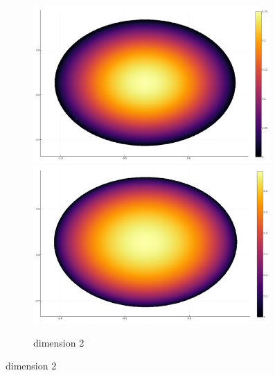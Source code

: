\documentclass[10pt,a4paper]{report}
\theoremstyle{plain}
\theoremstyle{definition}
\theoremstyle{remark}
\begin{document}
\begin{figure}
  \centering
  \begin{subfigure}[t]{0.49\textwidth}

    \includegraphics[width=0.99\textwidth]{det2.png}
    \includegraphics[width=0.99\textwidth]{ent2.png}
    \caption{dimension 2}


\end{subfigure}
\end{figure}
\end{document}
